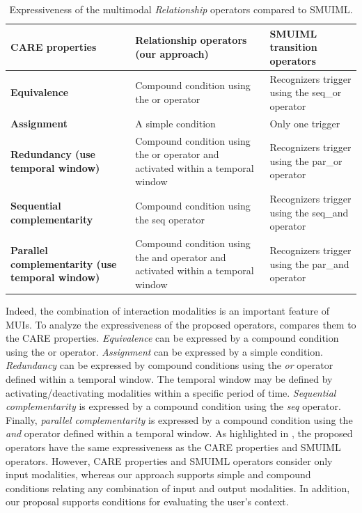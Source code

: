 \begin{table}[b!]
\scriptsize
\def\arraystretch{1.3}
\begin{tabular}{ m{4cm} m{4.5cm} m{4.5cm}}
	\hline
	\textbf{CARE properties} & \textbf{Relationship operators \newline (our approach)} & \textbf{SMUIML transition operators} \\
	\hline

	\textbf{Equivalence} &	Compound condition using the or operator &
	Recognizers
	trigger using the seq\_or operator \\
	\hline
	\textbf{Assignment} &	A simple condition &	Only one trigger \\
	\hline
	\textbf{Redundancy (use temporal window)} & Compound condition using the or
	operator
	and activated within a temporal window &	Recognizers trigger using the
	par\_or operator \\
	\hline
	\textbf{Sequential complementarity} & Compound condition using the seq
	operator &
	Recognizers trigger using the seq\_and operator \\
	\hline
	\textbf{Parallel complementarity (use temporal window)} & Compound
	condition using
	the and operator and activated within a temporal window &	Recognizers
	trigger using the par\_and operator \\
	\hline

\end{tabular}
\caption{Expressiveness of the multimodal \textit{Relationship} operators
compared to
SMUIML.}
\label{table:care}
\end{table}

Indeed, the combination of interaction modalities is an important feature of
MUIs. To analyze the expressiveness of the proposed operators,
 compares them to the CARE properties. \textit{Equivalence} can
be expressed by a compound condition using the or operator. \textit{Assignment}
can be expressed by a simple condition. \textit{Redundancy} can be expressed by
compound conditions using the \textit{or} operator defined within a temporal
window. The temporal window may be defined by activating/deactivating modalities
within a specific period of time.
\textit{Sequential complementarity} is expressed by a compound condition using
the \textit{seq} operator. Finally, \textit{parallel complementarity} is
expressed by a compound condition using the \textit{and} operator defined within
a temporal window. As highlighted in , the proposed operators
have the same expressiveness as the CARE properties and SMUIML operators.
However, CARE properties and SMUIML operators consider only input modalities,
whereas our approach supports simple and compound conditions relating any
combination of input and output modalities. In addition, our proposal supports
conditions for evaluating the user’s context.

